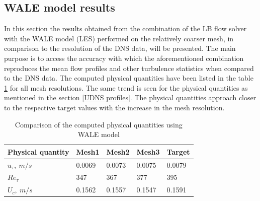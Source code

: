 \subsection{WALE model results}
In this section the results obtained from the combination of the LB flow solver with the WALE model (LES) performed on the relatively coarser mesh, in comparison to the resolution of the DNS data, will be presented. The main purpose is to access the accuracy with which the aforementioned combination reproduces the mean flow profiles and other turbulence statistics when compared to the DNS data. The computed physical quantities have been listed in the table \ref{Global quantities WALE} for all mesh resolutions. The same trend is seen for the physical quantities as mentioned in the section \ref{UDNS profiles}. The physical quantities approach closer to the respective target values with the increase in the mesh resolution. 
%
\begin{table}[h!]
\begin{center}
\begin{tabular}{ p{3cm}|p{1.5cm}p{1.5cm}p{1.5cm}p{1.5cm}  } 
\hline
Physical quantity & Mesh1 & Mesh2 & Mesh3 & Target \\
  \hline
  \multirow{1}{6em}{$u_\tau,\ m/s$}  & 0.0069 & 0.0073 & 0.0075 & 0.0079\\
  \hline
  \multirow{1}{6em}{$Re_\tau$} & 347 & 367 & 377 & 395\\
  \hline
  \multirow{1}{6em}{$U_c,\ m/s$} & 0.1562 & 0.1557 & 0.1547 & 0.1591\\
  \hline
\end{tabular}
\end{center}
\caption{Comparison of the computed physical quantities using WALE model}
\label{Global quantities WALE}
\end{table}
%
